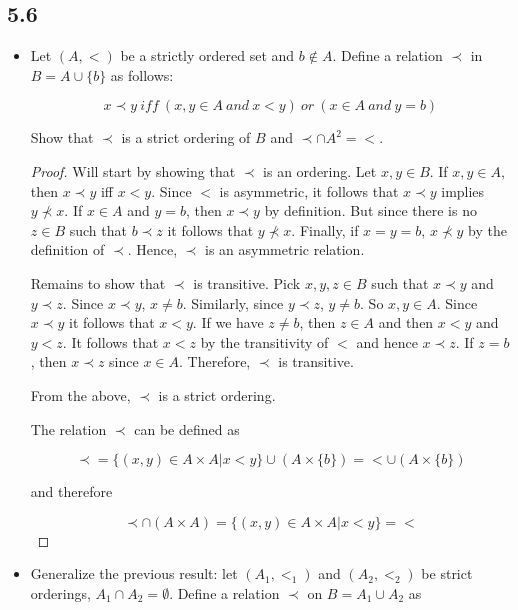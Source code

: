 \subsection*{5.6}

\begin{itemize}
    \item Let $(A, <)$ be a strictly ordered set and $b \notin A$. Define a relation $\prec$ in $B = A \cup \{b\}$ as follows:

$$ x \prec y~iff~(x,y \in A~and~x < y)~or~(x \in A~and~y = b)$$

Show that $\prec$ is a strict ordering of $B$ and $\prec \cap A^2 = <$.

\begin{proof}

Will start by showing that $\prec$ is an ordering. Let $x,y \in B$. If $x,y \in A$, then $x \prec y$ iff $x < y$. Since $<$ is asymmetric, it follows that $x \prec y$ implies $y \nprec x$. If $x \in A$ and $y = b$, then $x \prec y$ by definition. But since there is no $z \in B$ such that $b \prec z$ it follows that $y \nprec x$. Finally, if $x = y = b$, $x \nprec y$ by the definition of $\prec$. Hence, $\prec$ is an asymmetric relation.

Remains to show that $\prec$ is transitive. Pick $x,y,z \in B$ such that $x \prec y$ and $y \prec z$. Since $x \prec y$, $x \neq b$. Similarly, since $y \prec z$, $y \neq b$. So $x,y \in A$. Since $x \prec y$ it follows that $x < y$. If we have $z \neq b$, then $z \in A$ and then $x < y$ and $y < z$. It follows that $x < z$ by the transitivity of $<$ and hence $x \prec z$. If $z = b$, then $x \prec z$ since $x \in A$. Therefore, $\prec$ is transitive.

From the above, $\prec$ is a strict ordering.

\vspace{1em}

The relation $\prec$ can be defined as

$$ \prec = \{(x,y) \in A \times A | x < y\} \cup (A \times \{b\}) = < \cup (A \times \{b\})$$

and therefore

$$ \prec \cap (A \times A) = \{(x,y) \in A \times A | x < y\} = <$$
    
\end{proof}

\item Generalize the previous result: let $(A_1, <_1)$ and $(A_2, <_2)$ be strict orderings, $A_1 \cap A_2 = \emptyset$. Define a relation $\prec$ on $B = A_1 \cup A_2$ as


\end{itemize}
